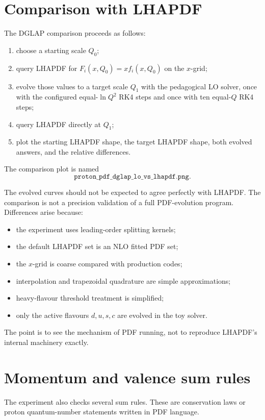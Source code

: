 \documentclass[11pt]{article}
\begin{document}
\section{Comparison with LHAPDF}

The DGLAP comparison proceeds as follows:
\begin{enumerate}
  \item choose a starting scale \(Q_0\);
  \item query LHAPDF for \(F_i(x,Q_0)=x f_i(x,Q_0)\) on the \(x\)-grid;
  \item evolve those values to a target scale \(Q_1\) with the pedagogical LO
        solver, once with the configured equal-\(\ln Q^2\) RK4 steps and once
        with ten equal-\(Q\) RK4 steps;
  \item query LHAPDF directly at \(Q_1\);
  \item plot the starting LHAPDF shape, the target LHAPDF shape, both evolved
        answers, and the relative differences.
\end{enumerate}
The comparison plot is named
\[
  \texttt{proton\_pdf\_dglap\_lo\_vs\_lhapdf.png}.
\]

The evolved curves should not be expected to agree perfectly with LHAPDF.  The
comparison is not a precision validation of a full PDF-evolution program.
Differences arise because:
\begin{itemize}
  \item the experiment uses leading-order splitting kernels;
  \item the default LHAPDF set is an NLO fitted PDF set;
  \item the \(x\)-grid is coarse compared with production codes;
  \item interpolation and trapezoidal quadrature are simple approximations;
  \item heavy-flavour threshold treatment is simplified;
  \item only the active flavours \(d,u,s,c\) are evolved in the toy solver.
\end{itemize}
The point is to see the mechanism of PDF running, not to reproduce LHAPDF's
internal machinery exactly.

\section{Momentum and valence sum rules}

The experiment also checks several sum rules.  These are conservation laws or
proton quantum-number statements written in PDF language.
\end{document}
